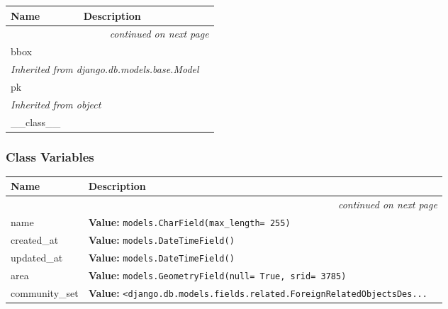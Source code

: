     \vspace{-1cm}
\hspace{\varindent}\begin{longtable}{|p{\varnamewidth}|p{\vardescrwidth}|l}
\cline{1-2}
\cline{1-2} \centering \textbf{Name} & \centering \textbf{Description}& \\
\cline{1-2}
\endhead\cline{1-2}\multicolumn{3}{r}{\small\textit{continued on next page}}\\\endfoot\cline{1-2}
\endlastfoot\raggedright b\-b\-o\-x\- & &\\
\cline{1-2}
\multicolumn{2}{|l|}{\textit{Inherited from django.db.models.base.Model}}\\
\multicolumn{2}{|p{\varwidth}|}{\raggedright pk}\\
\cline{1-2}
\multicolumn{2}{|l|}{\textit{Inherited from object}}\\
\multicolumn{2}{|p{\varwidth}|}{\raggedright \_\_class\_\_}\\
\cline{1-2}
\end{longtable}



  \subsubsection{Class Variables}

    \vspace{-1cm}
\hspace{\varindent}\begin{longtable}{|p{\varnamewidth}|p{\vardescrwidth}|l}
\cline{1-2}
\cline{1-2} \centering \textbf{Name} & \centering \textbf{Description}& \\
\cline{1-2}
\endhead\cline{1-2}\multicolumn{3}{r}{\small\textit{continued on next page}}\\\endfoot\cline{1-2}
\endlastfoot\raggedright n\-a\-m\-e\- & \raggedright \textbf{Value:} 
{\tt models.CharField(max\_length= 255)}&\\
\cline{1-2}
\raggedright c\-r\-e\-a\-t\-e\-d\-\_\-a\-t\- & \raggedright \textbf{Value:} 
{\tt models.DateTimeField()}&\\
\cline{1-2}
\raggedright u\-p\-d\-a\-t\-e\-d\-\_\-a\-t\- & \raggedright \textbf{Value:} 
{\tt models.DateTimeField()}&\\
\cline{1-2}
\raggedright a\-r\-e\-a\- & \raggedright \textbf{Value:} 
{\tt models.GeometryField(null= True, srid= 3785)}&\\
\cline{1-2}
\raggedright c\-o\-m\-m\-u\-n\-i\-t\-y\-\_\-s\-e\-t\- & \raggedright \textbf{Value:} 
{\tt {\textless}django.db.models.fields.related.ForeignRelatedObjectsDes\texttt{...}}&\\
\cline{1-2}
\end{longtable}

